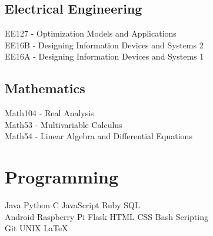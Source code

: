 \documentclass[]{format}
\begin{document}
\begin{minipage}[t]{0.33\textwidth}
\subsection{Electrical Engineering}
EE127 - Optimization Models and Applications \\
EE16B - Designing Information Devices and Systems 2 \\
EE16A - Designing Information Devices and Systems 1 \\
\sectionsep

\subsection{Mathematics}
Math104 - Real Analysis \\
Math53 - Multivariable Calculus \\
Math54 - Linear Algebra and Differential Equations
\sectionsep


\section{Programming}
Java \textbullet{}   Python \textbullet{} C \textbullet{} JavaScript \textbullet{} Ruby \textbullet{}
SQL \\
Android \textbullet{} Raspberry Pi \textbullet{} Flask \textbullet{} HTML \textbullet{} CSS \textbullet{} Bash Scripting \\
Git \textbullet{} UNIX \textbullet{} LaTeX
\sectionsep

%
%

\end{minipage} 
\hfill
\end{document}
